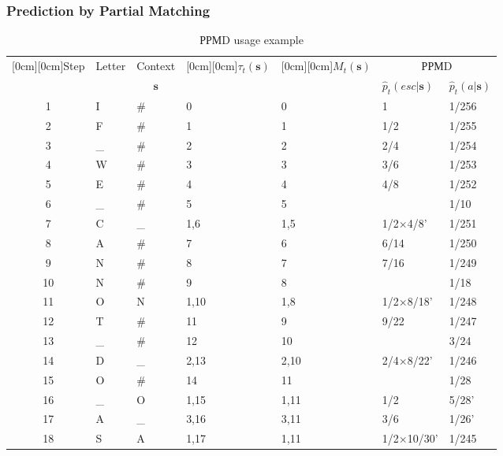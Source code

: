 \documentclass[14pt]{beamer}
\renewcommand{\vec}[1]{\ensuremath{\boldsymbol{#1}}}
\begin{document}
\begin{frame}
\frametitle{Prediction by Partial Matching}
\begin{itemize}    

    \begin{table}[htbp]
    \caption{РРМD usage example} \scriptsize{
    \begin{center}
    \scalebox{0.7} {
    \begin{tabular}
    {|c|l|l|l|l|l|l|} \hline %
    \raisebox{-1.50ex}[0cm][0cm]{Step}&
    {Letter}&
    {Context }&
    \raisebox{-1.50ex}[0cm][0cm]{$\tau _t ({\vec s})$}&
    \raisebox{-1.50ex}[0cm][0cm]{$M_t ({\vec s})$}&
    \multicolumn{2}{c|}{РРМD}  \\
    \cline{6-7}
     & & \multicolumn{1}{c|}{$\vec s$}&  &  & $\hat {p}_t(esc\vert {\vec s})$&
    $\hat {p}_t(a\vert {\vec s})$ \\ \hline %
    1& I& \textsf{{\#}}& 0& 0& 1& 1/256 \\ \hline %
    2& F& {\#}& 1& 1& 1/2& 1/255 \\ \hline %
    3& {\_}& {\#}& 2& 2& 2/4& 1/254 \\ \hline %
    4& W& {\#}& 3& 3& 3/6& 1/253 \\ \hline %
    5& E& {\#}& 4& 4& 4/8& 1/252 \\ \hline %
    6& {\_}& {\#}& 5& 5& & 1/10 \\ \hline %
    7& C& {\_}& 1,6& 1,5& 1/2$\times $4/8'& 1/251 \\\hline %
    8& A& {\#}& 7& 6& 6/14& 1/250 \\ \hline %
    9& N& {\#}& 8& 7& 7/16& 1/249 \\ \hline %
    10& N& {\#}& 9& 8& & 1/18 \\ \hline %
    11& O& N & 1,10& 1,8& 1/2$\times $8/18'& 1/248 \\ \hline %
    12& T& {\#}& 11& 9& 9/22& 1/247 \\ \hline %
    13& {\_}& {\#}& 12& 10& & 3/24 \\ \hline %
    14& D& {\_}& 2,13& 2,10& 2/4$\times $8/22'& 1/246 \\ \hline %
    15& O& {\#}& 14& 11& & 1/28 \\ \hline %
    16& {\_}& O & 1,15& 1,11& 1/2& 5/28' \\ \hline %
    17& A& {\_}& 3,16& 3,11& 3/6& 1/26' \\ \hline %
    18& S& A & 1,17& 1,11& 1/2$\times $10/30'& 1/245 \\\hline %

\end{tabular}}
\end{center}}
\end{table}
\end{itemize}
\end{frame}
\end{document}
